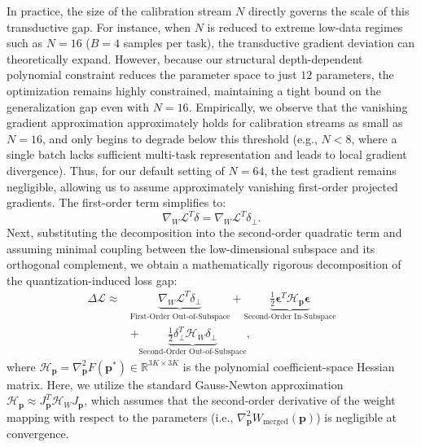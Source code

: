 In practice, the size of the calibration stream $N$ directly governs the scale of this transductive gap. For instance, when $N$ is reduced to extreme low-data regimes such as $N=16$ ($B=4$ samples per task), the transductive gradient deviation can theoretically expand. However, because our structural depth-dependent polynomial constraint reduces the parameter space to just $12$ parameters, the optimization remains highly constrained, maintaining a tight bound on the generalization gap even with $N=16$. Empirically, we observe that the vanishing gradient approximation approximately holds for calibration streams as small as $N=16$, and only begins to degrade below this threshold (e.g., $N < 8$, where a single batch lacks sufficient multi-task representation and leads to local gradient divergence). Thus, for our default setting of $N=64$, the test gradient remains negligible, allowing us to assume approximately vanishing first-order projected gradients. The first-order term simplifies to:
\begin{equation}
    \nabla_W \mathcal{L}^T \delta = \nabla_W \mathcal{L}^T \delta_{\perp}.
\end{equation}
Next, substituting the decomposition into the second-order quadratic term and assuming minimal coupling between the low-dimensional subspace and its orthogonal complement, we obtain a mathematically rigorous decomposition of the quantization-induced loss gap:
\begin{equation}
\label{eq:loss_decomp}
\begin{split}
    \Delta \mathcal{L} \approx & \underbrace{\nabla_W \mathcal{L}^T \delta_{\perp}}_{\text{First-Order Out-of-Subspace}} + \underbrace{\frac{1}{2} \boldsymbol{\epsilon}^T \mathcal{H}_{\mathbf{p}} \boldsymbol{\epsilon}}_{\text{Second-Order In-Subspace}} \\
    & + \underbrace{\frac{1}{2} \delta_{\perp}^T \mathcal{H}_W \delta_{\perp}}_{\text{Second-Order Out-of-Subspace}},
\end{split}
\end{equation}
where $\mathcal{H}_{\mathbf{p}} = \nabla^2_{\mathbf{p}} F(\mathbf{p}^*) \in \mathbb{R}^{3K \times 3K}$ is the polynomial coefficient-space Hessian matrix. Here, we utilize the standard Gauss-Newton approximation $\mathcal{H}_{\mathbf{p}} \approx J_{\mathbf{p}}^T \mathcal{H}_W J_{\mathbf{p}}$, which assumes that the second-order derivative of the weight mapping with respect to the parameters (i.e., $\nabla^2_{\mathbf{p}} W_{\text{merged}}(\mathbf{p})$) is negligible at convergence. 

